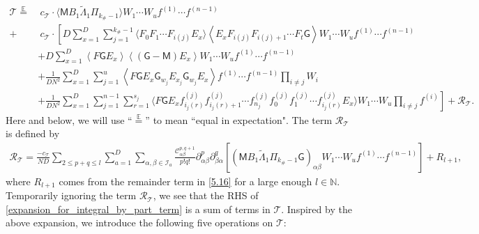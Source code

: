 \documentclass[10pt,reqno]{amsart}
\numberwithin{equation}{section}
\numberwithin{figure}{section}
\theoremstyle{plain} %
\theoremstyle{definition} %
\newcommand{\wt}{\widetilde}
\newcommand{\E}{\mathbb{E}}
\newcommand{\N}{\mathbb{N}}
\newcommand{\cT}{\mathcal T}
\newcommand{\cI}{\mathcal{I}}
\newcommand{\cC}{\mathcal{C}}
\newcommand{\cR}{{\mathcal R}}
\newcommand{\sG}{\mathsf G}
\newcommand{\sM}{\mathsf M}
\newcommand{\smm}{\mathsf m}
\newcommand{\scT}{{\mathscr{T}}}
\renewcommand{\leq}{\le}
\newcommand{\p}[1]{({#1})}
\newcommand{\pa}[1]{\left({#1}\right)}
\newcommand{\qa}[1]{\left[{#1}\right]}
\newcommand{\avg}[1]{\langle #1 \rangle}
\newcommand{\tLambda}{{\wt{\Lambda}}}
\newcommand{\iab}{\alpha\beta}
\newcommand{\iba}{\beta\alpha}
\newcommand{\eq}{\overset{\E}{=}}
\numberwithin{equation}{section}
\begin{document}
        \begin{align}
            \cT\eq &~%
            c_{\cT}\cdot \avg{ \sM B_1 \tLambda_1 \Pi_{k_{\#}-1} } W_1 \cdots W_u f^{(1)} \cdots f^{(n-1)}\nonumber\\
            +&~ c_{\cT} \cdot \left[D \sum_{x=1}^D \sum_{j=1}^{k_{\#}-1}\avg{ F_0 F_1 \cdots F_{i(j)} E_x}\left\langle E_x F_{i(j)} F_{i(j)+1} \cdots F_t \sG\right\rangle W_1 \cdots W_u f^{(1)} \cdots f^{(n-1)}\right.\nonumber \\ & +D \sum_{x=1}^D\left\langle F \sG E_x\right\rangle\left\langle\left(\sG-\sM\right) E_x\right\rangle W_1 \cdots W_u f^{(1)} \cdots f^{(n-1)} \label{expansion_for_integral_by_part_term}\\ & +\frac{1}{D N^2} \sum_{x=1}^D \sum_{j=1}^u\left\langle F \sG E_x \sG_{w_j} E_{x_j} \sG_{w_j} E_x\right\rangle f^{(1)} \cdots f^{(n-1)} \prod_{i \neq j} W_i\nonumber \\ & \left.+\frac{1}{D N^2} \sum_{x=1}^D \sum_{j=1}^{n-1} \sum_{r=1}^{s_j}\avg{ F \sG E_x f_{i_j\pa{r}}^{(j)} f_{i_j\pa{r}+1}^{(j)} \cdots f_{n_j}^{(j)} f_0^{(j)} f_1^{(j)} \cdots f_{i_j\pa{r}}^{(j)} E_x} W_1 \cdots W_u \prod_{i \neq j} f^{(i)}\right]+\cR_{\cT}.\nonumber
        \end{align}
    Here and below, we will use ``$\eq$'' to mean ``equal in expectation". The term $\cR_\cT$ is defined by
    \begin{equation}\label{reminder_terms_expansion}
        \begin{aligned}
            \cR_{\cT}=\frac{-c_{\cT}}{ND}\sum_{2\leq p+q\leq l}\sum_{a=1}^D\sum_{\alpha,\beta\in \cI_a}\frac{\cC_{\iab}^{p,q+1}}{p!q!}\partial_{\iab}^p\partial_{\iba}^q\qa{\p{\sM B_1 \tLambda_1 \Pi_{k_{\#}-1}\sG}_{\iab} W_1 \cdots W_u f^{(1)} \cdots f^{(n-1)}}+R_{l+1},
        \end{aligned}
    \end{equation}
    where $R_{l+1}$ comes from the remainder term in \eqref{5.16} for a large enough $l\in \N$. 
    Temporarily ignoring the term $\cR_\cT$, we see that the RHS of \eqref{expansion_for_integral_by_part_term} is a sum of terms in $\scT$. Inspired by the above expansion, we introduce the following five operations on $\scT$:
\medskip
    
\end{document}
